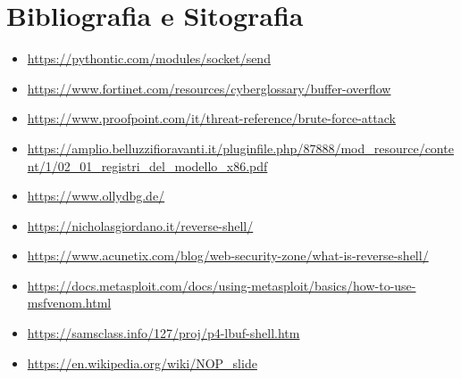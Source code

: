 \documentclass[12pt,letterpaper]{article} %
\begin{document}
\newpage
\null
\vfill

\vfill
\newpage
\section{Bibliografia e Sitografia} 

\begin{itemize}
\item \url{https://pythontic.com/modules/socket/send}
\item \url{https://www.fortinet.com/resources/cyberglossary/buffer-overflow}
\item \url{https://www.proofpoint.com/it/threat-reference/brute-force-attack}
\item \url{https://amplio.belluzzifioravanti.it/pluginfile.php/87888/mod_resource/content/1/02_01_registri_del_modello_x86.pdf}
\item \url{https://www.ollydbg.de/}
\item \url{https://nicholasgiordano.it/reverse-shell/}
\item \url{https://www.acunetix.com/blog/web-security-zone/what-is-reverse-shell/}
\item \url{https://docs.metasploit.com/docs/using-metasploit/basics/how-to-use-msfvenom.html}
\item \url{https://samsclass.info/127/proj/p4-lbuf-shell.htm}
\item \url{https://en.wikipedia.org/wiki/NOP_slide}
\end{itemize}
\end{document}
